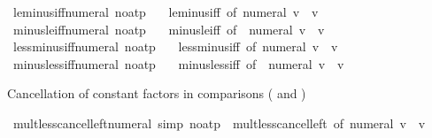 \begin{isabellebody}
\isanewline
{}\isamarkupfalse%
\ le{\isacharunderscore}{\kern0pt}minus{\isacharunderscore}{\kern0pt}iff{\isacharunderscore}{\kern0pt}numeral\ {\isacharbrackleft}{\kern0pt}no{\isacharunderscore}{\kern0pt}atp{\isacharbrackright}{\kern0pt}\ {\isacharequal}{\kern0pt}\isanewline
\ \ le{\isacharunderscore}{\kern0pt}minus{\isacharunderscore}{\kern0pt}iff\ {\isacharbrackleft}{\kern0pt}of\ {\isachardoublequoteopen}numeral\ v{\isachardoublequoteclose}{\isacharbrackright}{\kern0pt}\ \ v\isanewline
\isanewline
{}\isamarkupfalse%
\ minus{\isacharunderscore}{\kern0pt}le{\isacharunderscore}{\kern0pt}iff{\isacharunderscore}{\kern0pt}numeral\ {\isacharbrackleft}{\kern0pt}no{\isacharunderscore}{\kern0pt}atp{\isacharbrackright}{\kern0pt}\ {\isacharequal}{\kern0pt}\isanewline
\ \ minus{\isacharunderscore}{\kern0pt}le{\isacharunderscore}{\kern0pt}iff\ {\isacharbrackleft}{\kern0pt}of\ {\isacharunderscore}{\kern0pt}\ {\isachardoublequoteopen}numeral\ v{\isachardoublequoteclose}{\isacharbrackright}{\kern0pt}\ \ v\isanewline
\isanewline
{}\isamarkupfalse%
\ less{\isacharunderscore}{\kern0pt}minus{\isacharunderscore}{\kern0pt}iff{\isacharunderscore}{\kern0pt}numeral\ {\isacharbrackleft}{\kern0pt}no{\isacharunderscore}{\kern0pt}atp{\isacharbrackright}{\kern0pt}\ {\isacharequal}{\kern0pt}\isanewline
\ \ less{\isacharunderscore}{\kern0pt}minus{\isacharunderscore}{\kern0pt}iff\ {\isacharbrackleft}{\kern0pt}of\ {\isachardoublequoteopen}numeral\ v{\isachardoublequoteclose}{\isacharbrackright}{\kern0pt}\ \ v\isanewline
\isanewline
{}\isamarkupfalse%
\ minus{\isacharunderscore}{\kern0pt}less{\isacharunderscore}{\kern0pt}iff{\isacharunderscore}{\kern0pt}numeral\ {\isacharbrackleft}{\kern0pt}no{\isacharunderscore}{\kern0pt}atp{\isacharbrackright}{\kern0pt}\ {\isacharequal}{\kern0pt}\isanewline
\ \ minus{\isacharunderscore}{\kern0pt}less{\isacharunderscore}{\kern0pt}iff\ {\isacharbrackleft}{\kern0pt}of\ {\isacharunderscore}{\kern0pt}\ {\isachardoublequoteopen}numeral\ v{\isachardoublequoteclose}{\isacharbrackright}{\kern0pt}\ \ v%
\begin{isamarkuptext}%
Cancellation of constant factors in comparisons (\isa{{\isacharless}{\kern0pt}} and \isa{{\isasymle}})%
\end{isamarkuptext}\isamarkuptrue%
\isamarkupfalse%
\ mult{\isacharunderscore}{\kern0pt}less{\isacharunderscore}{\kern0pt}cancel{\isacharunderscore}{\kern0pt}left{\isacharunderscore}{\kern0pt}numeral\ {\isacharbrackleft}{\kern0pt}simp{\isacharcomma}{\kern0pt}\ no{\isacharunderscore}{\kern0pt}atp{\isacharbrackright}{\kern0pt}\ {\isacharequal}{\kern0pt}\ mult{\isacharunderscore}{\kern0pt}less{\isacharunderscore}{\kern0pt}cancel{\isacharunderscore}{\kern0pt}left\ {\isacharbrackleft}{\kern0pt}of\ {\isachardoublequoteopen}numeral\ v{\isachardoublequoteclose}{\isacharbrackright}{\kern0pt}\ \ v\isanewline

\end{isabellebody}
